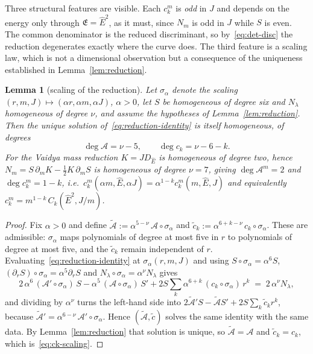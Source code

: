\documentclass[12pt]{iopart}
\newcommand{\Ehat}{\hat E}
\theoremstyle{plain}
\theoremstyle{definition}
\theoremstyle{plain}
\newtheorem{auxlemma}{Lemma}
\theoremstyle{remark}
\begin{document}
Three structural features are visible. Each $c_k^m$ is \emph{odd} in $J$ and depends on the
energy only through $\mathfrak E=\Ehat^2$, as it must, since $N_m$ is odd in $J$ while $S$
is even. The common denominator is the reduced discriminant, so
by~\eqref{eq:det-disc} the reduction degenerates exactly where the curve does. The third
feature is a scaling law, which is not a dimensional observation but a consequence of the
uniqueness established in Lemma~\ref{lem:reduction}.

\begin{auxlemma}[scaling of the reduction]\label{lem:ck-scaling}
Let $\sigma_\alpha$ denote the scaling $(r,m,J)\mapsto(\alpha r,\alpha m,\alpha J)$,
$\alpha>0$, let $S$ be homogeneous of degree six and $N_\lambda$ homogeneous of degree
$\nu$, and assume the hypotheses of Lemma~\ref{lem:reduction}. Then the unique solution
of~\eqref{eq:reduction-identity} is itself homogeneous, of degrees
\begin{equation}
   \deg\mathcal{A}=\nu-5,\qquad \deg c_k=\nu-6-k .
   \label{eq:ck-scaling}
\end{equation}
For the Vaidya mass reduction $K=JD_{\Ehat}$ is homogeneous of degree \emph{two}, hence
$N_m=S\,\partial_mK-\tfrac12K\,\partial_mS$ is homogeneous of degree $\nu=7$, giving
$\deg\mathcal{A}^m=2$ and $\deg c^m_k=1-k$, i.e.\
$c^m_k(\alpha m,\Ehat,\alpha J)=\alpha^{1-k}c^m_k(m,\Ehat,J)$ and equivalently
$c^m_k=m^{1-k}\,C_k(\Ehat^2,J/m)$.
\end{auxlemma}

\begin{proof}
Fix $\alpha>0$ and define
$\tilde{\mathcal{A}}:=\alpha^{5-\nu}\,\mathcal{A}\!\circ\!\sigma_\alpha$ and
$\tilde c_k:=\alpha^{6+k-\nu}\,c_k\!\circ\!\sigma_\alpha$. These are admissible: $\sigma_\alpha$
maps polynomials of degree at most five in $r$ to polynomials of degree at most five, and
the $\tilde c_k$ remain independent of $r$. Evaluating~\eqref{eq:reduction-identity} at
$\sigma_\alpha(r,m,J)$ and using $S\circ\sigma_\alpha=\alpha^6S$,
$(\partial_rS)\circ\sigma_\alpha=\alpha^5\partial_rS$ and
$N_\lambda\circ\sigma_\alpha=\alpha^\nu N_\lambda$ gives
\[
   2\,\alpha^{6}\,(\mathcal{A}'\!\circ\!\sigma_\alpha)\,S
   -\alpha^{5}\,(\mathcal{A}\circ\sigma_\alpha)\,S'
   +2S\sum_k\alpha^{6+k}\,(c_k\circ\sigma_\alpha)\,r^k
   \;=\;2\,\alpha^{\nu}N_\lambda ,
\]
and dividing by $\alpha^{\nu}$ turns the left-hand side into
$2\tilde{\mathcal{A}}'S-\tilde{\mathcal{A}}S'+2S\sum_k\tilde c_kr^k$, because
$\tilde{\mathcal{A}}'=\alpha^{6-\nu}\,\mathcal{A}'\!\circ\!\sigma_\alpha$. Hence
$(\tilde{\mathcal{A}},\tilde c)$ solves the same identity with the same data. By
Lemma~\ref{lem:reduction} that solution is unique, so
$\tilde{\mathcal{A}}=\mathcal{A}$ and $\tilde c_k=c_k$, which is~\eqref{eq:ck-scaling}.
\end{proof}
\end{document}
